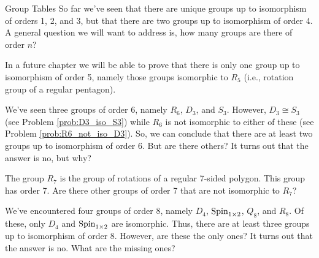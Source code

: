 \begin{section}{Group Tables}
So far we've seen that there are unique groups up to isomorphism of orders 1, 2, and 3, but that there are two groups up to isomorphism of order 4.  A general question we will want to address is, how many groups are there of order $n$?

In a future chapter we will be able to prove that there is only one group up to isomorphism of order 5, namely those groups isomorphic to $R_5$ (i.e., rotation group of a regular pentagon).

We've seen three groups of order 6, namely $R_6$, $D_3$, and $S_3$.  However, $D_3\cong S_3$ (see Problem \ref{prob:D3_iso_S3}) while $R_6$ is not isomorphic to either of these (see Problem \ref{prob:R6_not_iso_D3}).  So, we can conclude that there are at least two groups up to isomorphism of order 6.   But are there others?  It turns out that the answer is no, but why?

The group $R_7$ is the group of rotations of a regular 7-sided polygon.  This group has order 7.  Are there other groups of order 7 that are not isomorphic to $R_7$? 

We've encountered four groups of order 8, namely $D_4$, $\operatorname{Spin}_{1\times 2}$, $Q_8$, and $R_8$.  Of these, only $D_4$ and $\operatorname{Spin}_{1\times 2}$ are isomorphic.  Thus, there are at least three groups up to isomorphism of order 8.  However, are these the only ones?  It turns out that the answer is no.  What are the missing ones?

\end{section}

